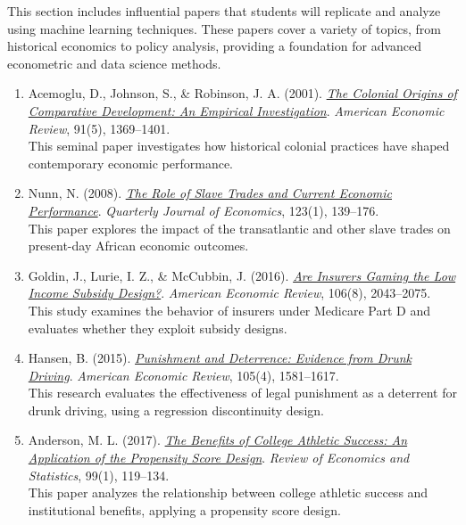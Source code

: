 \documentclass[11pt]{article}
\begin{document}
This section includes influential papers that students will replicate and analyze using machine learning techniques. These papers cover a variety of topics, from historical economics to policy analysis, providing a foundation for advanced econometric and data science methods.

\begin{enumerate}
    \item Acemoglu, D., Johnson, S., \& Robinson, J. A. (2001). \href{https://www.aeaweb.org/articles?id=10.1257/aer.91.5.1369}{\textit{The Colonial Origins of Comparative Development: An Empirical Investigation}}. \textit{American Economic Review}, 91(5), 1369–1401. \\
    This seminal paper investigates how historical colonial practices have shaped contemporary economic performance.

    \item Nunn, N. (2008). \href{https://scholar.harvard.edu/files/nunn/files/empirical_slavery.pdf}{\textit{The Role of Slave Trades and Current Economic Performance}}. \textit{Quarterly Journal of Economics}, 123(1), 139–176. \\
    This paper explores the impact of the transatlantic and other slave trades on present-day African economic outcomes.

    \item Goldin, J., Lurie, I. Z., \& McCubbin, J. (2016). \href{https://www.aeaweb.org/articles?id=10.1257/aer.20130903}{\textit{Are Insurers Gaming the Low Income Subsidy Design?}}. \textit{American Economic Review}, 106(8), 2043–2075. \\
    This study examines the behavior of insurers under Medicare Part D and evaluates whether they exploit subsidy designs.

    \item Hansen, B. (2015). \href{https://www.aeaweb.org/articles?id=10.1257/aer.20130189}{\textit{Punishment and Deterrence: Evidence from Drunk Driving}}. \textit{American Economic Review}, 105(4), 1581–1617. \\
    This research evaluates the effectiveness of legal punishment as a deterrent for drunk driving, using a regression discontinuity design.

    \item Anderson, M. L. (2017). \href{https://direct.mit.edu/rest/article-abstract/99/1/119/58365/The-Benefits-of-College-Athletic-Success-An?redirectedFrom=fulltext}{\textit{The Benefits of College Athletic Success: An Application of the Propensity Score Design}}. \textit{Review of Economics and Statistics}, 99(1), 119–134. \\
    This paper analyzes the relationship between college athletic success and institutional benefits, applying a propensity score design.


\end{enumerate}
\end{document}
